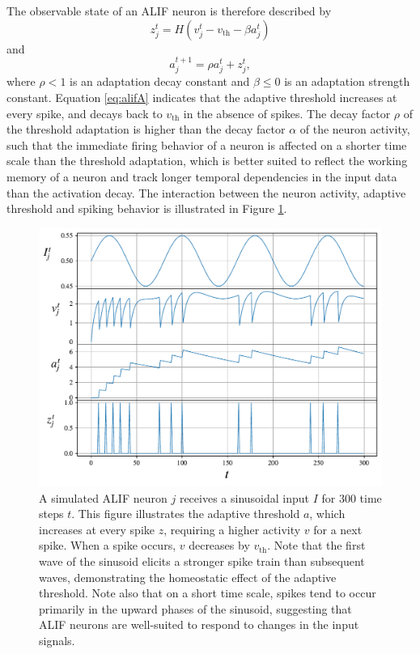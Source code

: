             The observable state of an ALIF neuron is therefore described by
            \begin{equation}\label{eq:alifZ}
            z^t_j = H\left(v_j^t - v_\text{th} - \beta a^t_j\right)
            \end{equation}
            and
            \begin{equation}\label{eq:alifA}
            a^{t+1}_j = \rho a^t_j + z^t_j,
            \end{equation}
            where $\rho < 1$ is an adaptation decay constant and $\beta \leq 0$ is an adaptation strength constant.
            Equation \ref{eq:alifA} indicates that the adaptive threshold increases at every spike, and decays back to $v_\text{th}$ in the absence of spikes.
            The decay factor $\rho$ of the threshold adaptation is higher than the decay factor $\alpha$ of the neuron activity, such that the immediate firing behavior of a neuron is affected on a shorter time scale than the threshold adaptation, which is better suited to reflect the working memory of a neuron and track longer temporal dependencies in the input data than the activation decay.
            The interaction between the neuron activity, adaptive threshold and spiking behavior is illustrated in Figure \ref{fig:simplealif}.

            \begin{figure}[!ht]
                \centering
                \includegraphics[width=\linewidth]{gfx/simplealif}
                \caption[ALIF neuron simulation]{A simulated ALIF neuron $j$ receives a sinusoidal input $I$ for 300 time steps $t$. This figure illustrates the adaptive threshold $a$, which increases at every spike $z$, requiring a higher activity $v$ for a next spike. When a spike occurs, $v$ decreases by $v_\text{th}$. Note that the first wave of the sinusoid elicits a stronger spike train than subsequent waves, demonstrating the homeostatic effect of the adaptive threshold. Note also that on a short time scale, spikes tend to occur primarily in the upward phases of the sinusoid, suggesting that ALIF neurons are well-suited to respond to changes in the input signals.}
                \label{fig:simplealif}
            \end{figure}

